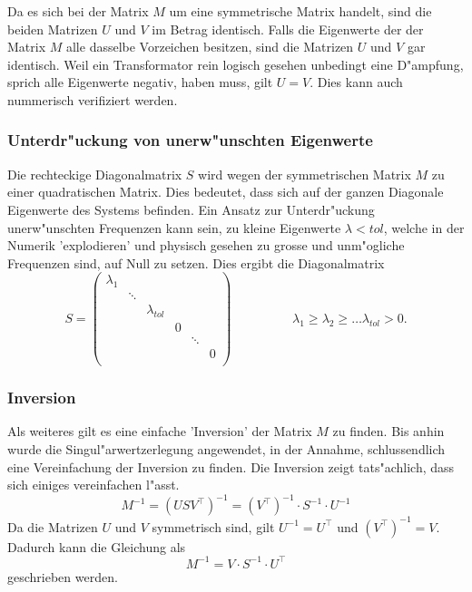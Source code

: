 \begin{refsection}
Da es sich bei der Matrix $M$ um eine symmetrische Matrix handelt, sind die beiden Matrizen $U$ und $V$ im Betrag identisch. Falls die Eigenwerte der der Matrix $M$ alle dasselbe Vorzeichen besitzen, sind die Matrizen $U$ und $V$ gar identisch. Weil ein Transformator rein logisch gesehen unbedingt eine D"ampfung, sprich alle Eigenwerte negativ, haben muss, gilt $U = V$. Dies kann auch nummerisch verifiziert werden.

\subsubsection{Unterdr"uckung von unerw"unschten Eigenwerte}
Die rechteckige Diagonalmatrix $S$ wird wegen der symmetrischen Matrix $M$ zu einer quadratischen Matrix. Dies bedeutet, dass sich auf der ganzen Diagonale Eigenwerte des Systems befinden. Ein Ansatz zur Unterdr"uckung unerw"unschten Frequenzen kann sein, zu kleine Eigenwerte $\lambda < tol$, welche in der Numerik 'explodieren' und physisch gesehen zu grosse und unm"ogliche Frequenzen sind, auf Null zu setzen. Dies ergibt die Diagonalmatrix 
\begin{equation*}
	S = \left( 
			\begin{array}{cccccc}
				\lambda_1 & & & & & \\
				& \ddots & & & &  \\
				& & \lambda_{tol} & & & \\
				& & & 0 & & \\
				& & & & \ddots & \\
				& & & & & 0 \\				
				\end{array}
			\right) 
			\hspace{2cm}\lambda_1 \geq \lambda_2 \geq \dots \lambda_{tol} > 0. 
\end{equation*}

\subsubsection{Inversion}
Als weiteres gilt es eine einfache 'Inversion' der Matrix $M$ zu finden. Bis anhin wurde die Singul"arwertzerlegung angewendet, in der Annahme, schlussendlich eine Vereinfachung der Inversion zu finden. Die Inversion zeigt tats"achlich, dass sich einiges vereinfachen l"asst.
\begin{equation*}
	M^{-1} = \left(USV^\top\right)^{-1} = \left(V^\top\right)^{-1} \cdot S^{-1} \cdot U^{-1}
\end{equation*}
Da die Matrizen $U$ und $V$ symmetrisch sind, gilt $U^{-1} = U^\top$ und $\left(V^\top\right)^{-1} = V$. Dadurch kann die Gleichung als 
\begin{equation*}
	M^{-1} = V \cdot S^{-1} \cdot U^\top
\end{equation*}
geschrieben werden.


\end{refsection}
